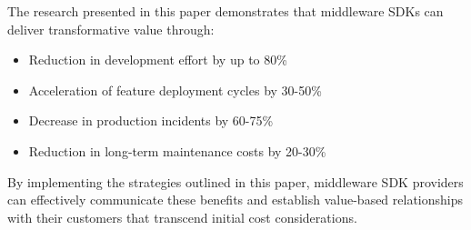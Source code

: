 \documentclass[11pt,a4paper]{article}
\begin{document}
The research presented in this paper demonstrates that middleware SDKs can deliver transformative value through:
\begin{itemize}
    \item Reduction in development effort by up to 80\%
    \item Acceleration of feature deployment cycles by 30-50\%
    \item Decrease in production incidents by 60-75\%
    \item Reduction in long-term maintenance costs by 20-30\%
\end{itemize}

By implementing the strategies outlined in this paper, middleware SDK providers can effectively communicate these benefits and establish value-based relationships with their customers that transcend initial cost considerations.



\end{document}
